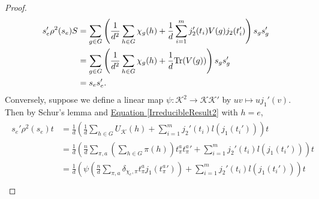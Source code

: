 \begin{proof}
\begin{align*}
\begin{split}
s_e'\rho^2(s_e)S &= \sum_{g \in G}\left(\frac{1}{d^2}\sum_{h \in G} \chi_g(h) + \frac{1}{d}\sum_{i=1}^m j_2'(t_i)V(g)j_2(t_i')\right)s_gs_g'\\
&= \sum_{g \in G}\left(\frac{1}{d^2}\sum_{h \in G} \chi_g(h) + \frac{1}{d}\textup{Tr}(V(g))\right)s_gs_g'\\
&= s_es_e'.
\end{split}
\end{align*}
\noindent Conversely, suppose we define a linear map $\psi : \mathcal{K}^2 \to \mathcal{K}\mathcal{K}'$ by $uv \mapsto uj_1'(v)$. Then by Schur's lemma and \hyperref[IrreducibleResult2]{Equation \eqref*{IrreducibleResult2}} with $h = e$,
\begin{align*}
\begin{split}
s_e'\rho^2(s_e)t &= \frac{1}{d}\left(\frac{1}{d}\sum_{h \in G} U_\mathcal{K}(h) + \sum_{i=1}^m j_2'(t_i)l(j_1(t_i'))\right)t\\
&= \frac{1}{d}\left(\frac{n}{d}\sum_{\pi,a}\left(\sum_{h \in G}\pi(h)\right)t_{\pi}^a{t_{\pi}^a}' + \sum_{i=1}^m j_2'(t_i)l(j_1(t_i'))\right)t\\
&= \frac{1}{d}\left(\psi\left(\frac{n}{d}\sum_{\pi,a}\delta_{\chi_e,\pi}t_\pi^aj_1({t_\pi^a}')\right) + \sum_{i=1}^m j_2'(t_i)l(j_1(t_i'))\right)t\\

\end{split}
\end{align*}
\end{proof}
